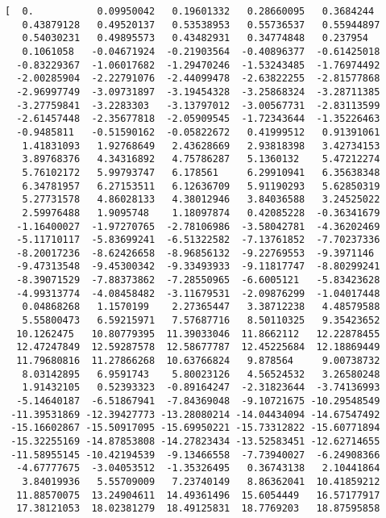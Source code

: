 \documentclass[11pt]{article}
\begin{document}
    \begin{Verbatim}[commandchars=\\\{\}]
[  0.           0.09950042   0.19601332   0.28660095   0.3684244
   0.43879128   0.49520137   0.53538953   0.55736537   0.55944897
   0.54030231   0.49895573   0.43482931   0.34774848   0.237954
   0.1061058   -0.04671924  -0.21903564  -0.40896377  -0.61425018
  -0.83229367  -1.06017682  -1.29470246  -1.53243485  -1.76974492
  -2.00285904  -2.22791076  -2.44099478  -2.63822255  -2.81577868
  -2.96997749  -3.09731897  -3.19454328  -3.25868324  -3.28711385
  -3.27759841  -3.2283303   -3.13797012  -3.00567731  -2.83113599
  -2.61457448  -2.35677818  -2.05909545  -1.72343644  -1.35226463
  -0.9485811   -0.51590162  -0.05822672   0.41999512   0.91391061
   1.41831093   1.92768649   2.43628669   2.93818398   3.42734153
   3.89768376   4.34316892   4.75786287   5.1360132    5.47212274
   5.76102172   5.99793747   6.178561     6.29910941   6.35638348
   6.34781957   6.27153511   6.12636709   5.91190293   5.62850319
   5.27731578   4.86028133   4.38012946   3.84036588   3.24525022
   2.59976488   1.9095748    1.18097874   0.42085228  -0.36341679
  -1.16400027  -1.97270765  -2.78106986  -3.58042781  -4.36202469
  -5.11710117  -5.83699241  -6.51322582  -7.13761852  -7.70237336
  -8.20017236  -8.62426658  -8.96856132  -9.22769553  -9.3971146
  -9.47313548  -9.45300342  -9.33493933  -9.11817747  -8.80299241
  -8.39071529  -7.88373862  -7.28550965  -6.6005121   -5.83423628
  -4.99313774  -4.08458482  -3.11679531  -2.09876299  -1.04017448
   0.04868268   1.1570199    2.27365447   3.38712238   4.48579588
   5.55800473   6.59215971   7.57687716   8.50110325   9.35423652
  10.1262475   10.80779395  11.39033046  11.8662112   12.22878455
  12.47247849  12.59287578  12.58677787  12.45225684  12.18869449
  11.79680816  11.27866268  10.63766824   9.878564     9.00738732
   8.03142895   6.9591743    5.80023126   4.56524532   3.26580248
   1.91432105   0.52393323  -0.89164247  -2.31823644  -3.74136993
  -5.14640187  -6.51867941  -7.84369048  -9.10721675 -10.29548549
 -11.39531869 -12.39427773 -13.28080214 -14.04434094 -14.67547492
 -15.16602867 -15.50917095 -15.69950221 -15.73312822 -15.60771894
 -15.32255169 -14.87853808 -14.27823434 -13.52583451 -12.62714655
 -11.58955145 -10.42194539  -9.13466558  -7.73940027  -6.24908366
  -4.67777675  -3.04053512  -1.35326495   0.36743138   2.10441864
   3.84019936   5.55709009   7.23740149   8.86362041  10.41859212
  11.88570075  13.24904611  14.49361496  15.6054449   16.57177917
  17.38121053  18.02381279  18.49125831  18.7769203   18.87595858

\end{Verbatim}
\end{document}
